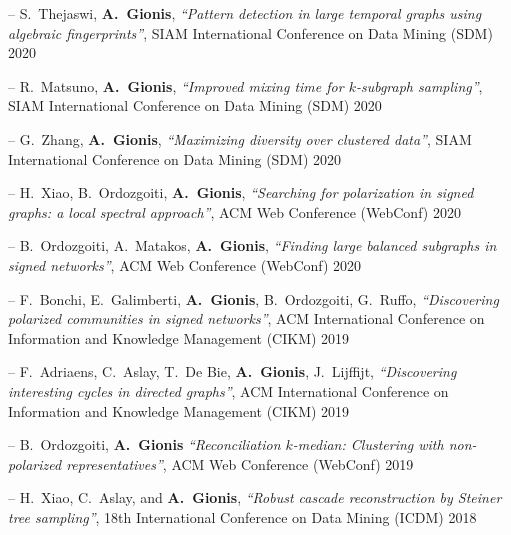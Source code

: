 \documentclass[a4paper,11pt]{article}
\begin{document}
\item[--] 
{S.\ Thejaswi, \textbf{A.\ Gionis}},
{\em ``Pattern detection in large temporal graphs using algebraic fingerprints''},
SIAM International Conference on Data Mining (SDM) 2020

\item[--] 
{R.\ Matsuno, \textbf{A.\ Gionis}},
{\em ``Improved mixing time for $k$-subgraph sampling''},
SIAM International Conference on Data Mining (SDM) 2020

\item[--] 
{G.\ Zhang, \textbf{A.\ Gionis}},
{\em ``Maximizing diversity over clustered data''},
SIAM International Conference on Data Mining (SDM) 2020

\item[--] 
{H.\ Xiao, B.\ Ordozgoiti, \textbf{A.\ Gionis}},
{\em ``Searching for polarization in signed graphs: a local spectral approach''},
ACM Web Conference (WebConf) 2020

\item[--] 
{B.\ Ordozgoiti, A.\ Matakos, \textbf{A.\ Gionis}},
{\em ``Finding large balanced subgraphs in signed networks''},
ACM Web Conference (WebConf) 2020

\item[--] 
{F.\ Bonchi, E.\ Galimberti, \textbf{A.\ Gionis}, B.\ Ordozgoiti, G.\ Ruffo},
{\em ``Discovering polarized communities in signed networks''},
ACM International Conference on Information and Knowledge Management (CIKM) 2019

\item[--] 
{F.\ Adriaens, C.\ Aslay, T.\ De Bie, \textbf{A.\ Gionis}, J.\ Lijffijt},
{\em ``Discovering interesting cycles in directed graphs''},
ACM International Conference on Information and Knowledge Management (CIKM) 2019

\item[--] 
{B.\ Ordozgoiti, \textbf{A.\ Gionis}}
{\em ``Reconciliation $k$-median: Clustering with non-polarized representatives''},
ACM Web Conference (WebConf) 2019


\item[--] 
{H.\ Xiao, C.\ Aslay, and \textbf{A.\ Gionis}}, 
{\em ``Robust cascade reconstruction by Steiner tree sampling''}, 
18th International Conference on Data Mining (ICDM) 2018
\end{document}
